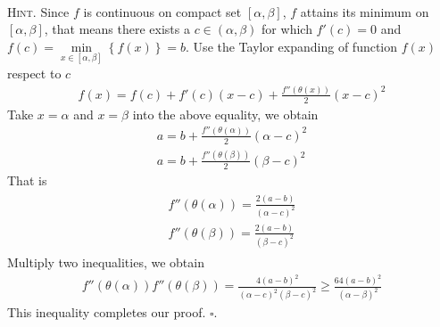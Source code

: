 \documentclass{article}
\numberwithin{equation}{section}
\begin{document}
\\
\textsc{Hint.} Since $f$ is continuous on compact set $\left[ {\alpha ,\beta } \right]$, $f$ attains its minimum on $\left[ {\alpha ,\beta } \right]$, that means there exists a $c \in (\alpha,\beta)$ for which $f'(c)=0$ and $f(c) = \mathop {\min }\limits_{x \in \left[ {\alpha ,\beta } \right]} \left\{ {f\left( x \right)} \right\}=b$. Use the Taylor expanding of function $f(x) $ respect to $c$
\begin{align}
f\left( x \right) = f\left( c \right) + f'\left( c \right)\left( {x - c} \right) + \frac{{f''\left( {\theta \left( x \right)} \right)}}{2}{\left( {x - c} \right)^2}
\end{align}
Take $x=\alpha$ and $x=\beta$ into the above equality, we obtain
\begin{align}
a = b + \frac{{f''\left( {\theta \left( \alpha  \right)} \right)}}{2}{\left( {\alpha  - c} \right)^2}\\
a = b + \frac{{f''\left( {\theta \left( \beta  \right)} \right)}}{2}{\left( {\beta  - c} \right)^2}
\end{align}
That is
\begin{align}
\begin{array}{l}
f''\left( {\theta \left( \alpha  \right)} \right) = \frac{{2\left( {a - b} \right)}}{{{{\left( {\alpha  - c} \right)}^2}}}\\
f''\left( {\theta \left( \beta  \right)} \right) = \frac{{2\left( {a - b} \right)}}{{{{\left( {\beta  - c} \right)}^2}}}
\end{array}
\end{align}
Multiply two inequalities, we obtain
\begin{align}
f''\left( {\theta \left( \alpha  \right)} \right)f''\left( {\theta \left( \beta  \right)} \right) = \frac{{4{{\left( {a - b} \right)}^2}}}{{{{\left( {\alpha  - c} \right)}^2}{{\left( {\beta  - c} \right)}^2}}} \ge \frac{{64{{\left( {a - b} \right)}^2}}}{{{{\left( {\alpha  - \beta } \right)}^2}}}
\end{align}
This inequality completes our proof. \hfill $\square$.
\end{document}

